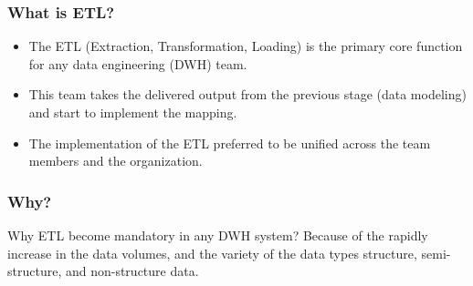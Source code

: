 \begin{frame}
	\frametitle{What is ETL?}

	\begin{itemize}[<+->]
		\item The ETL (Extraction, Transformation, Loading) is the primary core function for any data engineering (DWH) team.

		\item This team takes the delivered output from the previous stage (data modeling) and start to implement the mapping.

		\item The implementation of the ETL preferred to be unified across the team members and the organization.

	\end{itemize}

\end{frame}
\begin{frame}
	\frametitle{Why?}
	\centering
	\begin{block}{Why ETL become mandatory in any DWH system? }
		Because of the rapidly increase in the data volumes,
		and the variety of the data types structure, semi-structure, and non-structure data.
	\end{block}

\end{frame}

